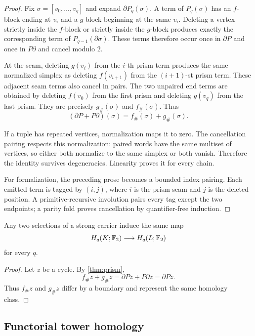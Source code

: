 \begin{proof}
Fix $\sigma=[v_0,\ldots,v_q]$ and expand $\partial P_q(\sigma)$.  A term of $P_q(\sigma)$ has an $f$-block ending at $v_i$ and a $g$-block beginning at the same $v_i$.  Deleting a vertex strictly inside the $f$-block or strictly inside the $g$-block produces exactly the corresponding term of $P_{q-1}(\partial\sigma)$.  These terms therefore occur once in $\partial P$ and once in $P\partial$ and cancel modulo $2$.

At the seam, deleting $g(v_i)$ from the $i$-th prism term produces the same normalized simplex as deleting $f(v_{i+1})$ from the $(i+1)$-st prism term.  These adjacent seam terms also cancel in pairs.  The two unpaired end terms are obtained by deleting $f(v_0)$ from the first prism and deleting $g(v_q)$ from the last prism.  They are precisely $g_\#(\sigma)$ and $f_\#(\sigma)$.  Thus
\[
  (\partial P+P\partial)(\sigma)=f_\#(\sigma)+g_\#(\sigma).
\]

If a tuple has repeated vertices, normalization maps it to zero.  The cancellation pairing respects this normalization: paired words have the same multiset of vertices, so either both normalize to the same simplex or both vanish.  Therefore the identity survives degeneracies.  Linearity proves it for every chain.

For formalization, the preceding prose becomes a bounded index pairing.  Each emitted term is tagged by $(i,j)$, where $i$ is the prism seam and $j$ is the deleted position.  A primitive-recursive involution pairs every tag except the two endpoints; a parity fold proves cancellation by quantifier-free induction.
\end{proof}

\begin{corollary}
\label{cor:choice-independent}
Any two selections of a strong carrier induce the same map
\[
  H_q(K;\mathbb{F}_{2})\longrightarrow H_q(L;\mathbb{F}_{2})
\]
for every $q$.
\end{corollary}

\begin{proof}
Let $z$ be a cycle.  By \cref{thm:prism},
\[
  f_\#z+g_\#z=\partial Pz+P\partial z=\partial Pz.
\]
Thus $f_\#z$ and $g_\#z$ differ by a boundary and represent the same homology class.
\end{proof}

\subsection{Functorial tower homology}

